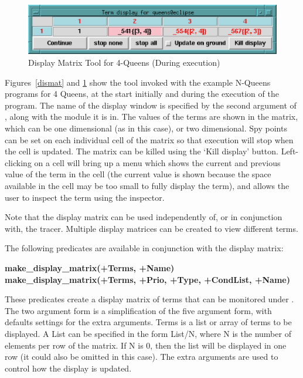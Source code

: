 \begin{figure}[bt]
\begin{center}
\includegraphics{dismat2.eps}
\end{center}
\caption{Display Matrix Tool for 4-Queens (During execution)}
\label{dismat2}
\end{figure}

Figures~\ref{dismat} and \ref{dismat2} show the tool
invoked with the example N-Queens programs for 4 Queens, at the start
initially and during the execution of the program. The name of the display
window is specified by the second argument of
,
along with the module it is in. The values of the terms are shown in the
matrix, which can be one dimensional (as in this case), or two
dimensional. Spy points can be set on each individual cell of the matrix
so that execution will stop when the cell is updated. The matrix can be
killed using the `Kill display' button. Left-clicking on a cell will bring
up a menu which shows the current and previous value of the term in the
cell (the current value is shown because the space available in the cell
may be too small to fully display the term), and allows the user to inspect
the term using the inspector. 

Note that the display matrix can be used independently of, or in conjunction
with, the tracer. Multiple display matrices can be created to view
different terms.

The following predicates are available in conjunction with the display
matrix:

\medskip
{\bf make_display_matrix(+Terms, +Name)} \\
{\bf make_display_matrix(+Terms, +Prio, +Type, +CondList, +Name)}

These
predicates create a display matrix of terms that can be monitored under
{\tkeclipse}. The two argument form is a simplification of the five argument
form, with defaults settings for the extra arguments. Terms is a list or
array of terms to be displayed. A List can be specified in the form List/N,
where N is the number of elements per row of the matrix. If N is 0, then
the list will be displayed in one row (it could also be omitted in this
case). The extra arguments are used to control how the display is updated.

